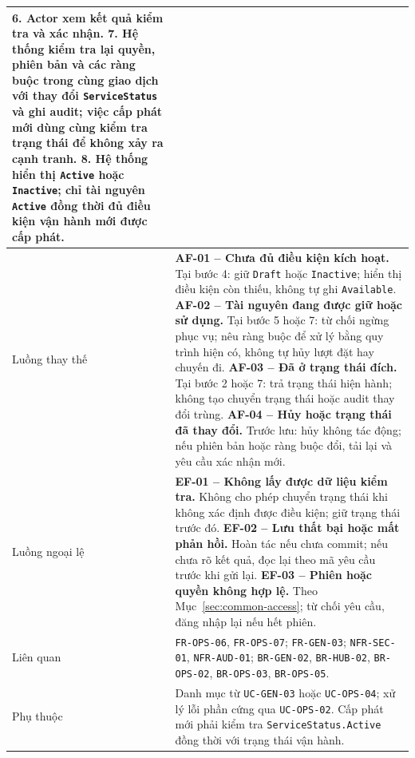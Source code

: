 \begin{longtable}{|L{26mm}|L{118mm}|}
\textbf{6.} Actor xem kết quả kiểm tra và xác nhận.\newline
\textbf{7.} Hệ thống kiểm tra lại quyền, phiên bản và các ràng buộc trong cùng giao dịch với thay đổi \texttt{ServiceStatus} và ghi audit; việc cấp phát mới dùng cùng kiểm tra trạng thái để không xảy ra cạnh tranh.\newline
\textbf{8.} Hệ thống hiển thị \texttt{Active} hoặc \texttt{Inactive}; chỉ tài nguyên \texttt{Active} đồng thời đủ điều kiện vận hành mới được cấp phát.\\\hline
  Luồng thay thế & \textbf{AF-01 -- Chưa đủ điều kiện kích hoạt.} Tại bước 4: giữ \texttt{Draft} hoặc \texttt{Inactive}; hiển thị điều kiện còn thiếu, không tự ghi \texttt{Available}.\newline
\textbf{AF-02 -- Tài nguyên đang được giữ hoặc sử dụng.} Tại bước 5 hoặc 7: từ chối ngừng phục vụ; nêu ràng buộc để xử lý bằng quy trình hiện có, không tự hủy lượt đặt hay chuyến đi.\newline
\textbf{AF-03 -- Đã ở trạng thái đích.} Tại bước 2 hoặc 7: trả trạng thái hiện hành; không tạo chuyển trạng thái hoặc audit thay đổi trùng.\newline
\textbf{AF-04 -- Hủy hoặc trạng thái đã thay đổi.} Trước lưu: hủy không tác động; nếu phiên bản hoặc ràng buộc đổi, tải lại và yêu cầu xác nhận mới.\\\hline
  Luồng ngoại lệ & \textbf{EF-01 -- Không lấy được dữ liệu kiểm tra.} Không cho phép chuyển trạng thái khi không xác định được điều kiện; giữ trạng thái trước đó.\newline
\textbf{EF-02 -- Lưu thất bại hoặc mất phản hồi.} Hoàn tác nếu chưa commit; nếu chưa rõ kết quả, đọc lại theo mã yêu cầu trước khi gửi lại.\newline
  \textbf{EF-03 -- Phiên hoặc quyền không hợp lệ.} Theo Mục~\ref{sec:common-access}; từ chối yêu cầu, đăng nhập lại nếu hết phiên.\\\hline
  Liên quan & \texttt{FR-OPS-06}, \texttt{FR-OPS-07}; \texttt{FR-GEN-03}; \texttt{NFR-SEC-01}, \texttt{NFR-AUD-01}; \texttt{BR-\texttt{GEN}-02}, \texttt{BR-HUB-02}, \texttt{BR-OPS-02}, \texttt{BR-OPS-03}, \texttt{BR-OPS-05}.\\\hline
  Phụ thuộc & Danh mục từ \texttt{UC-\texttt{GEN}-03} hoặc \texttt{UC-OPS-04}; xử lý lỗi phần cứng qua \texttt{UC-OPS-02}. Cấp phát mới phải kiểm tra \texttt{ServiceStatus.Active} đồng thời với trạng thái vận hành.\\\hline
\end{longtable}
\normalsize

